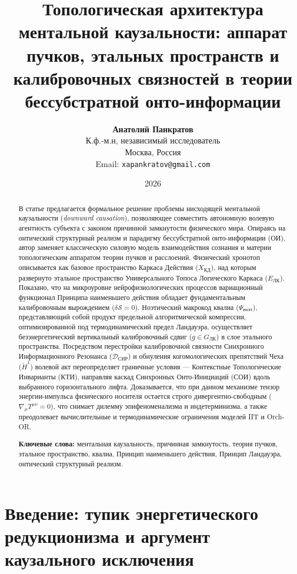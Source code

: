 \documentclass[12pt,a4paper]{article}
\title{\textbf{Топологическая архитектура ментальной каузальности: аппарат пучков, этальных пространств и калибровочных связностей в теории бессубстратной онто-информации}}
\author{
    \textbf{Анатолий Панкратов} \\
    \small К.ф.-м.н, независимый исследователь \\
    \small Москва, Россия \\
    \small Email: \texttt{xapankratov@gmail.com}
}
\date{2026}
\begin{document}
\maketitle

\begin{abstract}
В статье предлагается формальное решение проблемы нисходящей ментальной каузальности (\textit{downward causation}), позволяющее совместить автономную волевую агентность субъекта с законом причинной замкнутости физического мира. Опираясь на онтический структурный реализм и парадигму бессубстратной онто-информации (ОИ), автор заменяет классическую силовую модель взаимодействия сознания и материи топологическим аппаратом теории пучков и расслоений. Физический хронотоп описывается как базовое пространство Каркаса Действия ($X_{\text{КД}}$), над которым развернуто этальное пространство Универсального Топоса Логического Каркаса ($E_{\text{ЛК}}$). Показано, что на микроуровне нейрофизиологических процессов вариационный функционал Принципа наименьшего действия обладает фундаментальным калибровочным вырождением ($\delta \mathcal{S} = 0$). Ноэтический макрокод квалиа ($\Psi_{\text{ноэт}}$), представляющий собой продукт предельной алгоритмической компрессии, оптимизированной под термодинамический предел Ландауэра, осуществляет безэнергетический вертикальный калибровочный сдвиг ($g \in G_{\text{ЛК}}$) в слое этального пространства. Посредством перестройки калибровочной связности Синхронного Информационного Резонанса ($\mathcal{D}_{\text{СИР}}$) и обнуления когомологических препятствий Чеха ($\check{H}^1$) волевой акт переопределяет граничные условия --- Контекстные Топологические Инварианты (КТИ), направляя каскад Синхронных Онто-Инициаций (СОИ) вдоль выбранного горизонтального лифта. Доказывается, что при данном механизме тензор энергии-импульса физического носителя остается строго дивергентно-свободным ($\nabla_\mu T^{\mu\nu} = 0$), что снимает дилемму эпифеноменализма и индетерминизма, а также преодолевает вычислительные и термодинамические ограничения моделей IIT и Orch-OR.

\medskip
\noindent\textbf{Ключевые слова:} ментальная каузальность, причинная замкнутость, теория пучков, этальное пространство, квалиа, Принцип наименьшего действия, Принцип Ландауэра, онтический структурный реализм.
\end{abstract}

\section{Введение: тупик энергетического редукционизма и аргумент каузального исключения}
\end{document}
